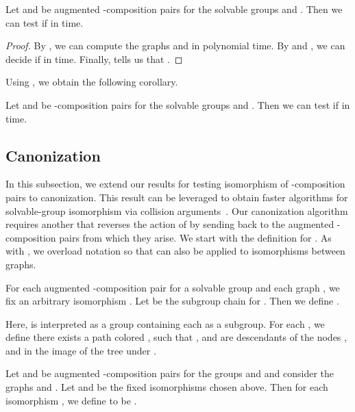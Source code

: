 \begin{theorem}
  \label{thm:aug-alpha-iso}
  Let  and  be augmented -composition pairs for the solvable groups  and .  Then we can test if  in  time.
\end{theorem}

\begin{proof}
  By , we can compute the graphs  and  in polynomial time.  By  and , we can decide if  in  time.  Finally,  tells us that  \ifft .\end{proof}

Using , we obtain the following corollary.


\begin{corollary}
  \label{cor:alpha-iso}
  Let  and  be -composition pairs for the solvable groups  and .  Then we can test if  in  time.
\end{corollary}

\subsection{Canonization}
In this subsection, we extend our results for testing isomorphism of -composition pairs to canonization.  This result can be leveraged to obtain faster algorithms for solvable-group isomorphism via collision arguments~\cite{rosenbaum2013b}.  Our canonization algorithm requires another   that reverses the action of  by sending back to the augmented -composition pairs from which they arise.  We start with the definition for .  As with , we overload notation so that  can also be applied to isomorphisms between graphs.

\begin{definition}
  \label{defn:Y-A}
  For each augmented -composition pair  for a solvable group  and each graph , we fix an arbitrary isomorphism .  Let  be the subgroup chain for .  Then we define .

  Here,  is interpreted as a group containing each  as a subgroup.  For each , we define  \ifft there exists a path  colored , such that ,  and  are descendants of the nodes ,  and  in the image of the tree  under .

  Let  and  be augmented -composition pairs for the groups  and  and consider the graphs  and  .  Let
   and  be the fixed isomorphisms chosen above.  Then for each isomorphism , we define  to be .
\end{definition}


